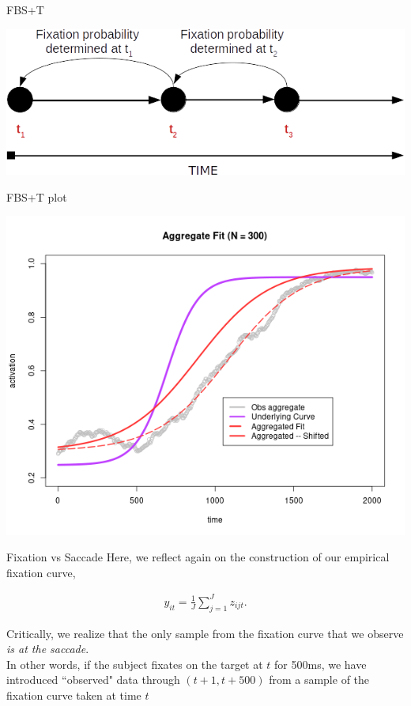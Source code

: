 \documentclass{beamer}
\begin{document}
\begin{frame}{FBS+T}
\begin{center}
\includegraphics[scale=0.45]{img/occulomotor_delay_1.png}
\end{center}
\end{frame}

\begin{frame}{FBS+T plot}
\begin{center}
\includegraphics[scale=0.45]{img/aggregate_fit_only.png}
\end{center}
\end{frame}

\begin{frame}{Fixation vs Saccade}
Here, we reflect again on the construction of our empirical fixation curve, 

\begin{align*}
y_{it} = \frac1J \sum_{j=1}^J z_{ijt}.
\end{align*}

Critically, we realize that the only sample from the fixation curve that we observe \textit{is at the saccade}. \newline \\

In other words, if the subject fixates on the target at $t$ for 500ms, we have introduced ``observed" data through $(t+1, t + 500)$ from a sample of the fixation curve taken at time $t$
\end{frame}
\end{document}
